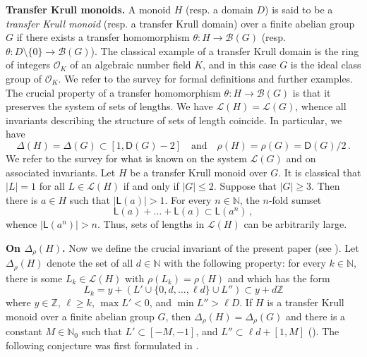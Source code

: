 \documentclass[a4paper,10pt]{amsart}
\theoremstyle{plain}
\theoremstyle{definition}
\newcommand{\N}{\mathbb N}
\newcommand{\Z}{\mathbb Z}
\numberwithin{equation}{section}
\begin{document}
\smallskip
\noindent
{\bf Transfer Krull monoids.} A monoid $H$ (resp. a domain $D$) is said to be a {\it transfer Krull monoid} (resp. a transfer Krull domain) over a finite abelian group $G$ if there exists a transfer homomorphism $\theta \colon H \to \mathcal B (G)$ (resp. $\theta \colon D \setminus \{0\} \to \mathcal B (G)$). The classical example of a transfer Krull domain is the ring of integers $\mathcal O_K$ of an algebraic number field $K$, and in this case $G$ is the ideal class group of $\mathcal O_K$. We refer to the survey \cite{Ge-Zh20a} for formal definitions and further examples. The crucial property of a transfer homomorphism $\theta \colon H \to \mathcal B (G)$ is that it preserves the system of sets of lengths. We have $\mathcal L (H) = \mathcal L (G)$, whence all invariants describing the structure of sets of length coincide. In particular, we have
\begin{equation} \label{upper-bounds}
\Delta (H) = \Delta (G) \subset [1, \mathsf D (G)-2] \quad \text{and} \quad \rho (H) = \rho (G) = \mathsf D (G)/2 \,.
\end{equation}
We refer to the survey \cite{Sc16a} for what is known on the system $\mathcal L (G)$ and on associated invariants. Let $H$ be a transfer Krull monoid over $G$. It is classical that $|L|=1$ for all $L \in \mathcal L (H)$ if and only if $|G| \le 2$. Suppose that $|G| \ge 3$. Then there is $a \in H$ such that $|\mathsf L (a)| > 1$. For every $n \in \N$,  the $n$-fold sumset
\[
\mathsf L (a) + \ldots + \mathsf L (a) \subset \mathsf L (a^n) \,,
\]
whence $|\mathsf L (a^n)| > n$. Thus, sets of lengths in $\mathcal L (H)$ can be arbitrarily large.

\smallskip
\noindent
{\bf On $\Delta_{\rho} (H)$.}
Now we define the crucial invariant of the present paper (see \cite[Definition 2.1]{Ge-Zh18a}). Let $\Delta_{\rho} (H)$ denote the set of all $d \in \N$ with the following property: for every $k \in \N$, there is some $L_k \in \mathcal L (H)$ with $\rho (L_k) = \rho (H)$ and which has the  form
\begin{equation} \label{eq:defAAP}
L_k = y + (L' \cup \{0, d , \ldots, \ell d\} \cup L'') \subset y + d \mathbb Z
\end{equation}
where $y\in \Z$, $\ell \ge k$,  $\max L' < 0$, and $\min L'' > \ell D$. If $H$ is a transfer Krull monoid over a finite abelian group $G$, then $\Delta_{\rho} (H) = \Delta_{\rho} (G)$ and there is a constant $M \in \N_0$ such that $L' \subset [-M,-1]$, and $L'' \subset \ell d + [1, M]$ (\cite[Lemma 2.3]{Ge-Zh18a}). The following conjecture was first formulated in \cite[Conjecture 3.20]{Ge-Zh18a}.
\end{document}
